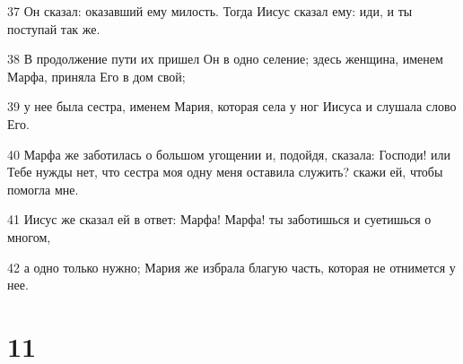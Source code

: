 \par 37 Он сказал: оказавший ему милость. Тогда Иисус сказал ему: иди, и ты поступай так же.
\par 38 В продолжение пути их пришел Он в одно селение; здесь женщина, именем Марфа, приняла Его в дом свой;
\par 39 у нее была сестра, именем Мария, которая села у ног Иисуса и слушала слово Его.
\par 40 Марфа же заботилась о большом угощении и, подойдя, сказала: Господи! или Тебе нужды нет, что сестра моя одну меня оставила служить? скажи ей, чтобы помогла мне.
\par 41 Иисус же сказал ей в ответ: Марфа! Марфа! ты заботишься и суетишься о многом,
\par 42 а одно только нужно; Мария же избрала благую часть, которая не отнимется у нее.

\chapter{11}

